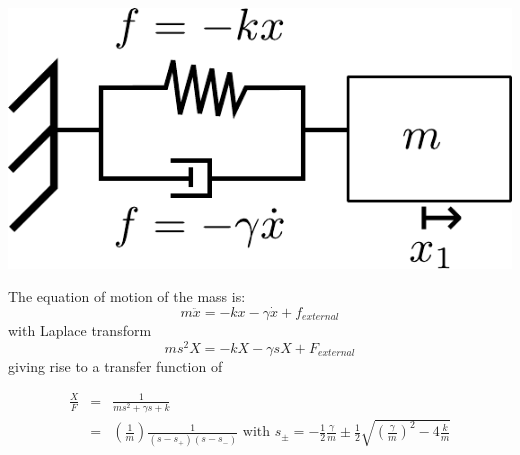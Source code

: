 \begin{center}
\includegraphics[width=0.25\paperwidth]{figures/damped-oscillator-diagram}
\par\end{center}

The equation of motion of the mass is:
\begin{equation}
m\ddot{x}=-kx-\gamma\dot{x}+f_{external}
\end{equation}
with Laplace transform
\begin{equation}
ms^{2}X=-kX-\gamma sX+F_{external}
\end{equation}
giving rise to a transfer function of

\begin{eqnarray*}
\frac{X}{F} & = & \frac{1}{ms^{2}+\gamma s+k}\\
 & = & \left(\frac{1}{m}\right)\frac{1}{\left(s-s_{+}\right)\left(s-s_{-}\right)}\text{ with }s_{\pm}=-\frac{1}{2}\frac{\gamma}{m}\pm\frac{1}{2}\sqrt{\left(\frac{\gamma}{m}\right)^{2}-4\frac{k}{m}}
\end{eqnarray*}





